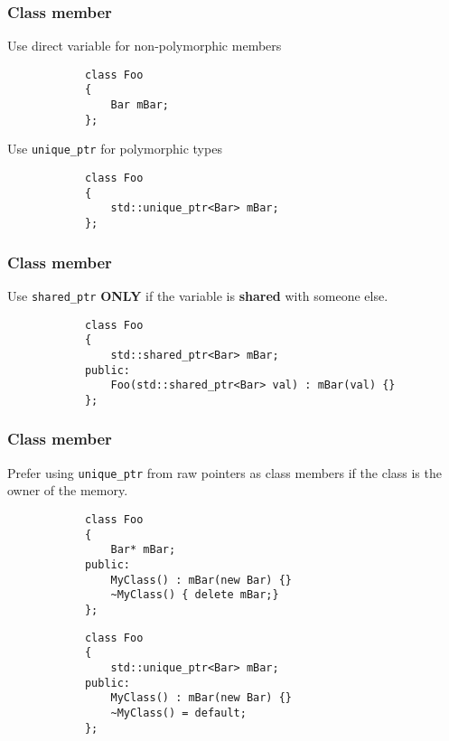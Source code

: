 \documentclass{beamer}
\begin{document}
\begin{frame}[fragile]
\frametitle{Class member}
	Use direct variable for non-polymorphic members
	\begin{example}
		\begin{lstlisting}
			class Foo
			{
				Bar mBar;
			};
		\end{lstlisting}
	\end{example}
	Use \texttt{unique\_ptr} for polymorphic types
	\begin{example}
		\begin{lstlisting}
			class Foo
			{
				std::unique_ptr<Bar> mBar;
			};
		\end{lstlisting}
	\end{example}
\end{frame}

\begin{frame}[fragile]
\frametitle{Class member}
	Use \texttt{shared\_ptr} \textbf{ONLY} if the variable is \textbf{shared} with someone
	else.
	\begin{example}
		\begin{lstlisting}
			class Foo
			{
				std::shared_ptr<Bar> mBar;
			public:
				Foo(std::shared_ptr<Bar> val) : mBar(val) {}
			};
		\end{lstlisting}
	\end{example}
\end{frame}

\begin{frame}[fragile]
\frametitle{Class member}
	Prefer using \texttt{unique\_ptr} from raw pointers as class members if the class is the owner of the memory.
	\begin{example}
		\begin{lstlisting}
			class Foo
			{
				Bar* mBar;
			public:
				MyClass() : mBar(new Bar) {}
				~MyClass() { delete mBar;}
			};
		\end{lstlisting}
	\end{example}
    \begin{example}
		\begin{lstlisting}
			class Foo
			{
				std::unique_ptr<Bar> mBar;
			public:
				MyClass() : mBar(new Bar) {}
				~MyClass() = default;
			};
		\end{lstlisting}
	\end{example}
\end{frame}
\end{document}
